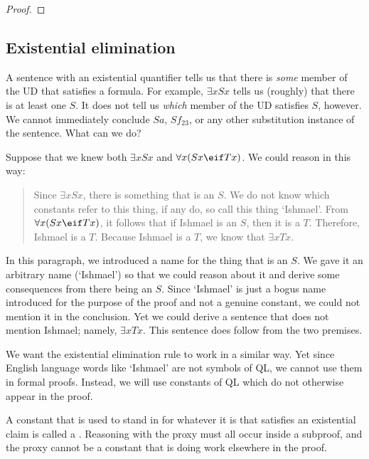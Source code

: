 \begin{proof}
	\open
	\close
\end{proof}


\subsection{Existential elimination}
A sentence with an existential quantifier tells us that there is \emph{some} member of the UD that satisfies a formula. For example, $\exists x Sx$ tells us (roughly) that there is at least one $S$. It does not tell us \emph{which} member of the UD satisfies $S$, however. We cannot immediately conclude $Sa$, $Sf_{23}$, or any other substitution instance of the sentence. What can we do?

Suppose that we knew both $\exists x Sx$ and $\forall x(Sx \eif Tx)$. We could reason in this way:



\begin{quote}
Since $\exists x Sx$, there is something that is an $S$. We do not know which constants refer to this thing, if any do, so call this thing `Ishmael'. From $\forall x(Sx \eif Tx)$, it follows that if Ishmael is an $S$, then it is a $T$. Therefore, Ishmael is a $T$.  Because Ishmael is a $T$, we know that $\exists x Tx$.
\end{quote}
In this paragraph, we introduced a name for the thing that is an $S$. We gave it an arbitrary name (`Ishmael') so that we could reason about it and derive some consequences from there being an $S$. Since `Ishmael' is just a bogus name introduced for the purpose of the proof and not a genuine constant, we could not mention it in the conclusion. Yet we could derive a sentence that does not mention Ishmael; namely, $\exists x Tx$. This sentence does follow from the two premises.

We want the existential elimination rule to work in a similar way. Yet since English language words like `Ishmael' are not symbols of QL, we cannot use them in formal proofs. Instead, we will use constants of QL which do not otherwise appear in the proof.

A constant that is used to stand in for whatever it is that satisfies an existential claim is called a . Reasoning with the proxy must all occur inside a subproof, and the proxy cannot be a constant that is doing work elsewhere in the proof.

